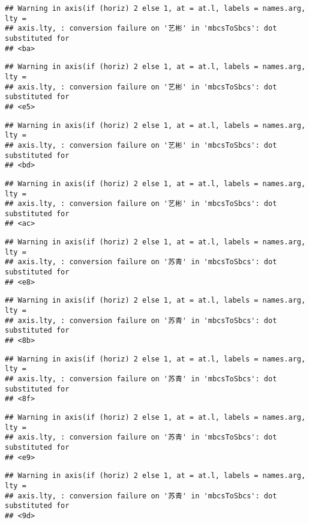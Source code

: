 \documentclass[
]{article}
\begin{document}
\begin{verbatim}
## Warning in axis(if (horiz) 2 else 1, at = at.l, labels = names.arg, lty =
## axis.lty, : conversion failure on '艺彬' in 'mbcsToSbcs': dot substituted for
## <ba>
\end{verbatim}

\begin{verbatim}
## Warning in axis(if (horiz) 2 else 1, at = at.l, labels = names.arg, lty =
## axis.lty, : conversion failure on '艺彬' in 'mbcsToSbcs': dot substituted for
## <e5>
\end{verbatim}

\begin{verbatim}
## Warning in axis(if (horiz) 2 else 1, at = at.l, labels = names.arg, lty =
## axis.lty, : conversion failure on '艺彬' in 'mbcsToSbcs': dot substituted for
## <bd>
\end{verbatim}

\begin{verbatim}
## Warning in axis(if (horiz) 2 else 1, at = at.l, labels = names.arg, lty =
## axis.lty, : conversion failure on '艺彬' in 'mbcsToSbcs': dot substituted for
## <ac>
\end{verbatim}

\begin{verbatim}
## Warning in axis(if (horiz) 2 else 1, at = at.l, labels = names.arg, lty =
## axis.lty, : conversion failure on '苏青' in 'mbcsToSbcs': dot substituted for
## <e8>
\end{verbatim}

\begin{verbatim}
## Warning in axis(if (horiz) 2 else 1, at = at.l, labels = names.arg, lty =
## axis.lty, : conversion failure on '苏青' in 'mbcsToSbcs': dot substituted for
## <8b>
\end{verbatim}

\begin{verbatim}
## Warning in axis(if (horiz) 2 else 1, at = at.l, labels = names.arg, lty =
## axis.lty, : conversion failure on '苏青' in 'mbcsToSbcs': dot substituted for
## <8f>
\end{verbatim}

\begin{verbatim}
## Warning in axis(if (horiz) 2 else 1, at = at.l, labels = names.arg, lty =
## axis.lty, : conversion failure on '苏青' in 'mbcsToSbcs': dot substituted for
## <e9>
\end{verbatim}

\begin{verbatim}
## Warning in axis(if (horiz) 2 else 1, at = at.l, labels = names.arg, lty =
## axis.lty, : conversion failure on '苏青' in 'mbcsToSbcs': dot substituted for
## <9d>
\end{verbatim}
\end{document}
